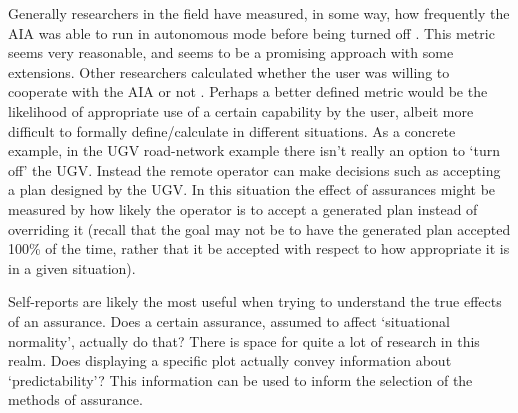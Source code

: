    Generally researchers in the field have measured, in some way, how frequently the AIA was able to run in autonomous mode before being turned off \cite{Freedy2007-sg,Desai2012-rc}. This metric seems very reasonable, and seems to be a promising approach with some extensions. Other researchers calculated whether the user was willing to cooperate with the AIA or not \cite{Salem2015-md,Wu2016-ei,Bainbridge2011-pl}. Perhaps a better defined metric would be the likelihood of appropriate use of a certain capability by the user, albeit more difficult to formally define/calculate in different situations. As a concrete example, in the UGV road-network example there isn't really an option to `turn off' the UGV. Instead the remote operator can make decisions such as accepting a plan designed by the UGV. In this situation the effect of assurances might be measured by how likely the operator is to accept a generated plan instead of overriding it (recall that the goal may not be to have the generated plan accepted 100\% of the time, rather that it be accepted with respect to how appropriate it is in a given situation).

    Self-reports are likely the most useful when trying to understand the true effects of an assurance. Does a certain assurance, assumed to affect `situational normality', actually do that? There is space for quite a lot of research in this realm. Does displaying a specific plot actually convey  information about `predictability'? This information can be used to inform the selection of the methods of assurance.

